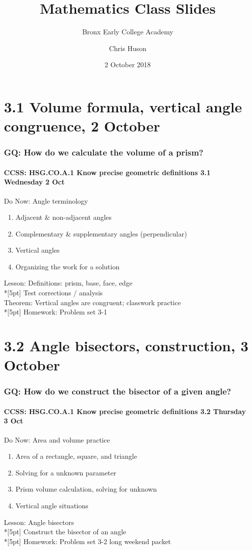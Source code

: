 \documentclass{beamer}
\title{Mathematics Class Slides}
\subtitle{Bronx Early College Academy}
\author{Chris Huson}
\date{2 October 2018}
\begin{document}
\frame{\titlepage}
\section[Outline]{}
\frame{\tableofcontents}

\section{3.1 Volume formula, vertical angle congruence, 2 October}
  \frame
  {
    \frametitle{GQ: How do we calculate the volume of a prism?}
    \framesubtitle{CCSS: HSG.CO.A.1 Know precise geometric definitions \hfill \alert{3.1 Wednesday 2 Oct}}

    \begin{block}{Do Now: Angle terminology}
    \begin{enumerate}
      \item Adjacent \& non-adjacent angles
      \item Complementary \& supplementary angles (perpendicular)
      \item Vertical angles
      \item Organizing the work for a solution
    \end{enumerate}
    \end{block}
    Lesson: Definitions: prism, base, face, edge  \\*[5pt]
    Test corrections / analysis\\
    Theorem: Vertical angles are congruent; classwork practice\\*[5pt]
    Homework: Problem set 3-1 
  }

  \section{3.2 Angle bisectors, construction, 3 October}
    \frame
    {
      \frametitle{GQ: How do we construct the bisector of a given angle?}
      \framesubtitle{CCSS: HSG.CO.A.1 Know precise geometric definitions \hfill \alert{3.2 Thursday 3 Oct}}

      \begin{block}{Do Now: Area and volume practice}
      \begin{enumerate}
        \item Area of a rectangle, square, and triangle
        \item Solving for a unknown parameter
        \item Prism volume calculation, solving for unknown
        \item Vertical angle situations
      \end{enumerate}
      \end{block}
      Lesson: Angle bisectors  \\*[5pt]
      Construct the bisector of an angle\\*[5pt]
      Homework: Problem set 3-2 long weekend packet
    }
\end{document}
